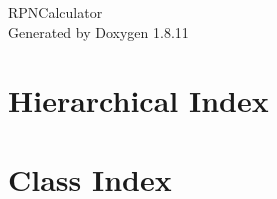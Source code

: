 \documentclass[twoside]{book}
\newcommand{\+}{\discretionary{\mbox{\scriptsize$\hookleftarrow$}}{}{}}
\newcommand{\clearemptydoublepage}{%
  \newpage{\pagestyle{empty}\cleardoublepage}%
}
\begin{document}
\hypersetup{pageanchor=false,
             bookmarksnumbered=true,
             pdfencoding=unicode
            }
\begin{titlepage}
\vspace*{7cm}
\begin{center}%
{\Large R\+P\+N\+Calculator }\\
\vspace*{1cm}
{\large Generated by Doxygen 1.8.11}\\
\end{center}
\end{titlepage}
\clearemptydoublepage
\tableofcontents
\clearemptydoublepage
{}
\hypersetup{pageanchor=true}

\chapter{Hierarchical Index}

\chapter{Class Index}

\end{document}
